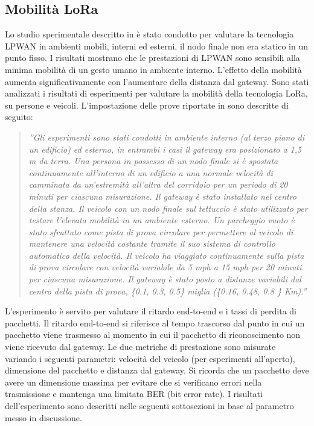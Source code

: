 \documentclass[a4paper]{report} %
\begin{document}
\subsection{Mobilità LoRa}
Lo studio sperimentale descritto in \cite{art:rif.47} è stato condotto per valutare la tecnologia LPWAN in ambienti mobili, interni ed esterni, il nodo finale non era statico in un punto fisso. I risultati mostrano che le prestazioni di LPWAN sono sensibili alla minima mobilità di un gesto umano in ambiente interno. L'effetto della mobilità aumenta significativamente con l'aumentare della distanza dal gateway. %
Sono stati analizzati i risultati di esperimenti per valutare la mobilità della tecnologia LoRa, su persone e veicoli. 
L'impostazione delle prove riportate in \cite{art:rif.47} sono descritte di seguito:
\begin{quote}
	\textit{''Gli esperimenti sono stati condotti in ambiente interno (al terzo piano di un edificio) ed esterno, in entrambi i casi il gateway era posizionato a 1,5 m da terra. 
	Una persona in possesso di un nodo finale si è spostata continuamente all'interno di un edificio a una normale velocità di camminata da un'estremità all'altra del corridoio per un periodo di 20 minuti per ciascuna misurazione. Il gateway è stato installato nel centro della stanza. 
	Il veicolo con un nodo finale sul tettuccio è stato utilizzato per testare l'elevata mobilità in un ambiente esterno. Un parcheggio vuoto è stato sfruttato come pista di prova circolare per permettere al veicolo di mantenere una velocità costante tramite il suo sistema di controllo automatico della velocità. Il veicolo ha viaggiato continuamente sulla pista di prova circolare con velocità variabile da 5 mph a 15 mph per 20 minuti per ciascuna misurazione. Il gateway è stato posto a distanze variabili dal centro della pista di prova, \{0.1, 0.3, 0.5\} miglia (\{0.16, 0.48, 0.8 \} Km).''}
\end{quote} 
L'esperimento è servito per valutare il ritardo end-to-end e i tassi di perdita di pacchetti. Il ritardo end-to-end si riferisce al tempo trascorso dal punto in cui un pacchetto viene trasmesso al momento in cui il pacchetto di riconoscimento non viene ricevuto dal gateway. Le due metriche di prestazione sono misurate variando i seguenti parametri: velocità del veicolo (per esperimenti all'aperto), dimensione del pacchetto e distanza dal gateway. 
Si ricorda che un pacchetto deve avere un dimensione massima per evitare che si verificano errori nella trasmissione e mantenga una limitata BER (bit error rate).
I risultati dell'esperimento sono descritti nelle seguenti sottosezioni in base al parametro messo in discussione.
\end{document}
